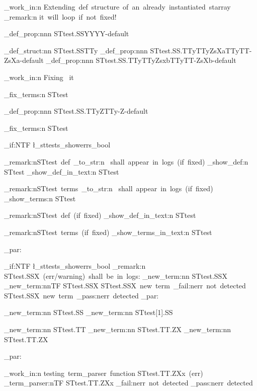 \documentclass{article}
\begin{document}
\sttests_work_in:n {Extending~def~structure~of~an~already~instantiated~starray}
\sttests_remark:n {it~will~loop~if~not~fixed!}

\starray_def_prop:nnn {STtest.SS}{YY}{YY-default}




\starray_def_struct:nn {STtest.SS}{TTy}
\starray_def_prop:nnn {STtest.SS.TTy}{TTyZsXa}{TTyTT-ZsXa-default}
\starray_def_prop:nnn {STtest.SS.TTy}{TTyZsxb}{TTyTT-ZsXb-default}

\sttests_work_in:n {Fixing ~it}

\starray_fix_terms:n {STtest}

\starray_def_prop:nnn {STtest.SS.TTy}{Z}{TTy-Z-default}

\starray_fix_terms:n {STtest}

\bool_if:NTF \l_sttests_showerrs_bool
  {
    \sttests_remark:n{STtest~def~\tl_to_str:n {\show}~shall~appear~in~logs~(if~fixed)}
    \starray_show_def:n {STtest}
    \starray_show_def_in_text:n {STtest}
    
    \sttests_remark:n{STtest~terms~\tl_to_str:n {\show}~shall~appear~in~logs~(if~fixed)}
    \starray_show_terms:n {STtest}
  }
  {
    \sttests_remark:n{STtest~def~(if~fixed)}
    \starray_show_def_in_text:n {STtest}
    
    \sttests_remark:n{STtest~terms~(if~fixed)}
    \starray_show_terms_in_text:n {STtest}
  }
\sttests_par:

\bool_if:NTF \l_sttests_showerrs_bool
  {
    \sttests_remark:n {STtest.SSX~(err/warning)~shall~be~in~logs:}
    \starray_new_term:nn {STtest.SSX}{}
  }
  {
    \starray_new_term:nnTF {STtest.SSX}{}
      {STtest.SSX~new~term~\sttests_fail:n{err~not~detected}}
      {STtest.SSX~new~term~\sttests_pass:n{err~detected}}
  }
\sttests_par:

        \starray_new_term:nn {STtest.SS}{}
        \starray_new_term:nn {STtest[1].SS}{}

        \starray_new_term:nn {STtest.TT}{}
        \starray_new_term:nn {STtest.TT.ZX}{}
        \starray_new_term:nn {STtest.TT.ZX}{}

\sttests_par:

\sttests_work_in:n {testing~term_parser~function}
STtest.TT.ZXx~(err)~
\starray_term_parser:nTF {STtest.TT.ZXx}
  {\sttests_fail:n{err~not~detected}}
  {\sttests_pass:n{err~detected}}
\end{document}
